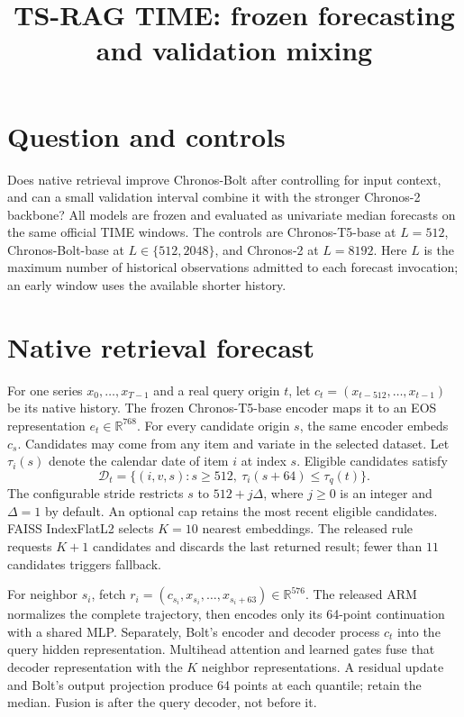 \documentclass[11pt,a4paper]{article}
\title{TS-RAG TIME: frozen forecasting and validation mixing}
\author{}\date{}
\begin{document}
\maketitle
\section{Question and controls}
Does native retrieval improve Chronos-Bolt after controlling for input context,
and can a small validation interval combine it with the stronger Chronos-2
backbone? All models are frozen and evaluated as univariate median forecasts
on the same official TIME windows. The controls are Chronos-T5-base at $L=512$,
Chronos-Bolt-base at $L\in\{512,2048\}$, and Chronos-2 at $L=8192$.
Here $L$ is the maximum number of historical observations admitted to each
forecast invocation; an early window uses the available shorter history.

\section{Native retrieval forecast}
For one series $x_0,\ldots,x_{T-1}$ and a real query origin $t$, let
$c_t=(x_{t-512},\ldots,x_{t-1})$ be its native history. The frozen
Chronos-T5-base encoder maps it to an EOS representation $e_t\in\mathbb R^{768}$.
For every candidate origin $s$, the same encoder embeds $c_s$. Candidates may come from any item and variate in the selected dataset.
Let $\tau_i(s)$ denote the calendar date of item $i$ at index $s$.
Eligible candidates satisfy
\[
  \mathcal D_t=\{(i,v,s): s\ge512,\ \tau_i(s+64)\le\tau_q(t)\}.
\]
The configurable stride restricts $s$ to $512+j\Delta$, where $j\ge0$ is an
integer and $\Delta=1$ by default. An optional cap retains the most recent
eligible candidates. FAISS IndexFlatL2 selects $K=10$ nearest embeddings.
The released rule requests $K+1$ candidates and discards the last returned
result; fewer than $11$ candidates triggers fallback.

For neighbor $s_i$, fetch $r_i=(c_{s_i},x_{s_i},\ldots,x_{s_i+63})\in\mathbb R^{576}$.
The released ARM normalizes the complete trajectory, then encodes only its
64-point continuation with a shared MLP. Separately, Bolt's encoder and
decoder process $c_t$ into the query hidden representation. Multihead
attention and learned gates fuse that decoder representation with the $K$
neighbor representations. A residual update and Bolt's output projection
produce 64 points at each quantile; retain the median.
Fusion is after the query decoder, not before it.
\end{document}
